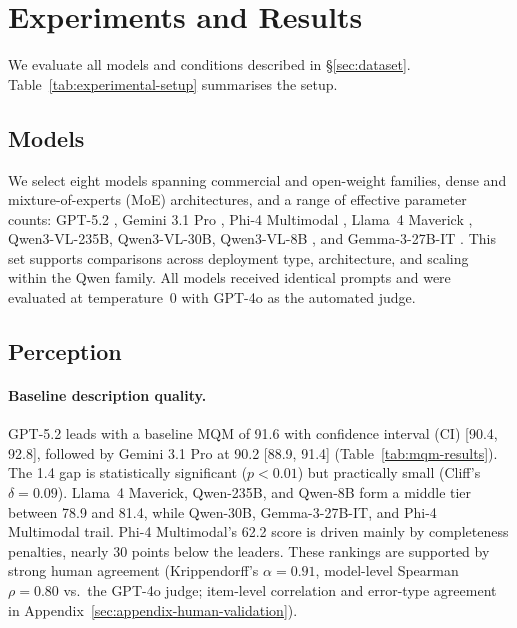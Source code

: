 \section{Experiments and Results}
\label{sec:results}

We evaluate all models and conditions described in \S\ref{sec:dataset}. Table~\ref{tab:experimental-setup} summarises the setup.

\subsection{Models}
\label{sec:models}

We select eight models spanning commercial and open-weight families, dense and mixture-of-experts (MoE) architectures, and a range of effective parameter counts: GPT-5.2 \citep{openai2025gpt5}, Gemini 3.1 Pro \citep{google2026gemini31pro}, Phi-4 Multimodal \citep{abouelenin2025phi4}, Llama~4 Maverick \citep{meta2025llama4}, Qwen3-VL-235B, Qwen3-VL-30B, Qwen3-VL-8B \citep{qwen2025qwen3vl}, and Gemma-3-27B-IT \citep{gemma2025gemma3}. This set supports comparisons across deployment type, architecture, and scaling within the Qwen family. All models received identical prompts and were evaluated at temperature~0 with GPT-4o \citep{openai2024gpt4o} as the automated judge.

\subsection{Perception}
\label{sec:perception-results}

\paragraph{Baseline description quality.}
GPT-5.2 leads with a baseline MQM of 91.6 with confidence interval (CI) [90.4, 92.8], followed by Gemini 3.1 Pro at 90.2 [88.9, 91.4] (Table~\ref{tab:mqm-results}). The 1.4 gap is statistically significant ($p < 0.01$) but practically small (Cliff's $\delta = 0.09$). Llama~4 Maverick, Qwen-235B, and Qwen-8B form a middle tier between 78.9 and 81.4, while Qwen-30B, Gemma-3-27B-IT, and Phi-4 Multimodal trail. Phi-4 Multimodal's 62.2 score is driven mainly by completeness penalties, nearly 30 points below the leaders. These rankings are supported by strong human agreement (Krippendorff's $\alpha = 0.91$, model-level Spearman $\rho = 0.80$ vs.\ the GPT-4o judge; item-level correlation and error-type agreement in Appendix~\ref{sec:appendix-human-validation}).


